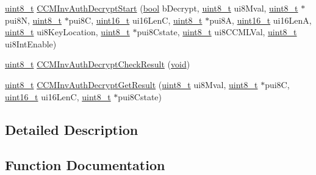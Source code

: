 \begin{DoxyCompactItemize}
\hyperlink{_p_e___types_8h_aba7bc1797add20fe3efdf37ced1182c5}{uint8\+\_\+t} \hyperlink{group__ccm__api_ga747713815a1b82db70ded61d7fa6d893}{C\+C\+M\+Inv\+Auth\+Decrypt\+Start} (\hyperlink{_p_e___types_8h_a97a80ca1602ebf2303258971a2c938e2}{bool} b\+Decrypt, \hyperlink{_p_e___types_8h_aba7bc1797add20fe3efdf37ced1182c5}{uint8\+\_\+t} ui8\+Mval, \hyperlink{_p_e___types_8h_aba7bc1797add20fe3efdf37ced1182c5}{uint8\+\_\+t} $\ast$pui8N, \hyperlink{_p_e___types_8h_aba7bc1797add20fe3efdf37ced1182c5}{uint8\+\_\+t} $\ast$pui8C, \hyperlink{_p_e___types_8h_a1f1825b69244eb3ad2c7165ddc99c956}{uint16\+\_\+t} ui16\+LenC, \hyperlink{_p_e___types_8h_aba7bc1797add20fe3efdf37ced1182c5}{uint8\+\_\+t} $\ast$pui8A, \hyperlink{_p_e___types_8h_a1f1825b69244eb3ad2c7165ddc99c956}{uint16\+\_\+t} ui16\+LenA, \hyperlink{_p_e___types_8h_aba7bc1797add20fe3efdf37ced1182c5}{uint8\+\_\+t} ui8\+Key\+Location, \hyperlink{_p_e___types_8h_aba7bc1797add20fe3efdf37ced1182c5}{uint8\+\_\+t} $\ast$pui8\+Cstate, \hyperlink{_p_e___types_8h_aba7bc1797add20fe3efdf37ced1182c5}{uint8\+\_\+t} ui8\+C\+C\+M\+L\+Val, \hyperlink{_p_e___types_8h_aba7bc1797add20fe3efdf37ced1182c5}{uint8\+\_\+t} ui8\+Int\+Enable)
\item 
\hyperlink{_p_e___types_8h_aba7bc1797add20fe3efdf37ced1182c5}{uint8\+\_\+t} \hyperlink{group__ccm__api_gaa832eb324f83c0a26ec613df17f6ffd5}{C\+C\+M\+Inv\+Auth\+Decrypt\+Check\+Result} (\hyperlink{usb__devapi_8h_afabf60e7f57651d6d595a02c75f07cd0}{void})
\item 
\hyperlink{_p_e___types_8h_aba7bc1797add20fe3efdf37ced1182c5}{uint8\+\_\+t} \hyperlink{group__ccm__api_ga741afc6687560caf5ee0b343377ffcd2}{C\+C\+M\+Inv\+Auth\+Decrypt\+Get\+Result} (\hyperlink{_p_e___types_8h_aba7bc1797add20fe3efdf37ced1182c5}{uint8\+\_\+t} ui8\+Mval, \hyperlink{_p_e___types_8h_aba7bc1797add20fe3efdf37ced1182c5}{uint8\+\_\+t} $\ast$pui8C, \hyperlink{_p_e___types_8h_a1f1825b69244eb3ad2c7165ddc99c956}{uint16\+\_\+t} ui16\+LenC, \hyperlink{_p_e___types_8h_aba7bc1797add20fe3efdf37ced1182c5}{uint8\+\_\+t} $\ast$pui8\+Cstate)
\end{DoxyCompactItemize}


\subsection{Detailed Description}


\subsection{Function Documentation}
